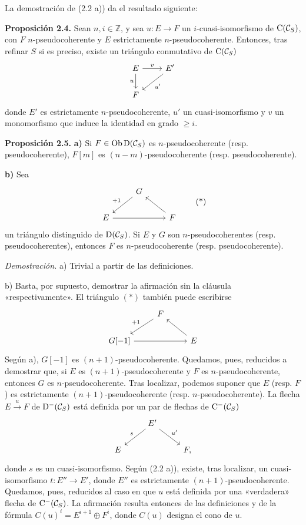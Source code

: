 La demostración de (2.2 a)) da el resultado siguiente:

\textbf{Proposición 2.4.} Sean \(n,i\in\mathbb Z\), y sea \(u:E\to F\) un \(i\)-cuasi-isomorfismo de \(\mathrm C(\mathcal C_S)\), con \(F\) \(n\)-pseudocoherente y \(E\) estrictamente \(n\)-pseudocoherente. Entonces, tras refinar \(S\) si es preciso, existe un triángulo conmutativo de \(\mathrm C(\mathcal C_S)\)
\[
\begin{tikzcd}
E \arrow[r,"v"] \arrow[d,"u"'] & E' \arrow[dl,"u'"]\\
F &
\end{tikzcd}
\]
donde \(E'\) es estrictamente \(n\)-pseudocoherente, \(u'\) un cuasi-isomorfismo y \(v\) un monomorfismo que induce la identidad en grado \(\geq i\).

\textbf{Proposición 2.5.} \textbf{a)} Si \(F\in\operatorname{Ob}\mathrm D(\mathcal C_S)\) es \(n\)-pseudocoherente (resp. pseudocoherente), \(F[m]\) es \((n-m)\)-pseudocoherente (resp. pseudocoherente).

\textbf{b)} Sea
\[
\begin{tikzcd}
& G \arrow[dl,"+1"'] & \\
E \arrow[rr] && F \arrow[ul]
\end{tikzcd}
\tag{*}
\]
un triángulo distinguido de \(\mathrm D(\mathcal C_S)\). Si \(E\) y \(G\) son \(n\)-pseudocoherentes (resp. pseudocoherentes), entonces \(F\) es \(n\)-pseudocoherente (resp. pseudocoherente).

\emph{Demostración.} a) Trivial a partir de las definiciones.

b) Basta, por supuesto, demostrar la afirmación sin la cláusula «respectivamente». El triángulo \((*)\) también puede escribirse
\[
\begin{tikzcd}
& F \arrow[dl,"+1"'] & \\
G[-1] \arrow[rr] && E \arrow[ul]
\end{tikzcd}
\]
Según a), \(G[-1]\) es \((n+1)\)-pseudocoherente. Quedamos, pues, reducidos a demostrar que, si \(E\) es \((n+1)\)-pseudocoherente y \(F\) es \(n\)-pseudocoherente, entonces \(G\) es \(n\)-pseudocoherente. Tras localizar, podemos suponer que \(E\) (resp. \(F\)) es estrictamente \((n+1)\)-pseudocoherente (resp. \(n\)-pseudocoherente). La flecha \(E\xrightarrow{u}F\) de \(\mathrm D^-(\mathcal C_S)\) está definida por un par de flechas de \(\mathrm C^-(\mathcal C_S)\)
\[
\begin{tikzcd}
& E' \arrow[dl,"s"'] \arrow[dr,"u'"]\\
E && F ,
\end{tikzcd}
\]
donde \(s\) es un cuasi-isomorfismo. Según (2.2 a)), existe, tras localizar, un cuasi-isomorfismo \(t:E''\to E'\), donde \(E''\) es estrictamente \((n+1)\)-pseudocoherente. Quedamos, pues, reducidos al caso en que \(u\) está definida por una «verdadera» flecha de \(\mathrm C^-(\mathcal C_S)\). La afirmación resulta entonces de las definiciones y de la fórmula \(C(u)^i=E^{i+1}\oplus F^i\), donde \(C(u)\) designa el cono de \(u\).

